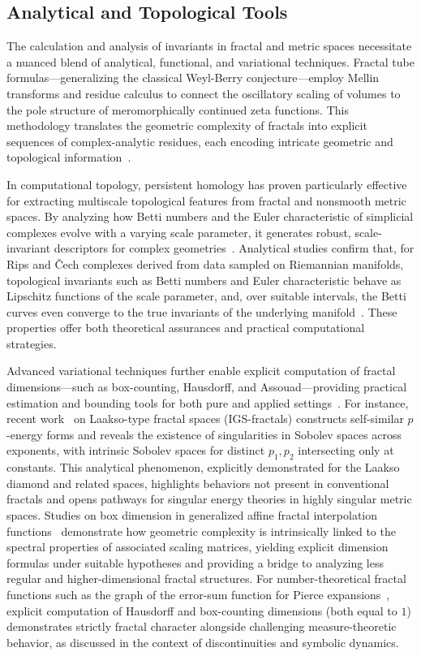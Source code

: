 \documentclass[sigconf]{acmart}
\begin{document}
\subsection{Analytical and Topological Tools}

The calculation and analysis of invariants in fractal and metric spaces necessitate a nuanced blend of analytical, functional, and variational techniques. Fractal tube formulas—generalizing the classical Weyl-Berry conjecture—employ Mellin transforms and residue calculus to connect the oscillatory scaling of volumes to the pole structure of meromorphically continued zeta functions. This methodology translates the geometric complexity of fractals into explicit sequences of complex-analytic residues, each encoding intricate geometric and topological information~\cite{ref21,ref33}.

In computational topology, persistent homology has proven particularly effective for extracting multiscale topological features from fractal and nonsmooth metric spaces. By analyzing how Betti numbers and the Euler characteristic of simplicial complexes evolve with a varying scale parameter, it generates robust, scale-invariant descriptors for complex geometries~\cite{ref88}. Analytical studies confirm that, for Rips and \v{C}ech complexes derived from data sampled on Riemannian manifolds, topological invariants such as Betti numbers and Euler characteristic behave as Lipschitz functions of the scale parameter, and, over suitable intervals, the Betti curves even converge to the true invariants of the underlying manifold~\cite{ref88}. These properties offer both theoretical assurances and practical computational strategies.

Advanced variational techniques further enable explicit computation of fractal dimensions—such as box-counting, Hausdorff, and Assouad—providing practical estimation and bounding tools for both pure and applied settings~\cite{ref13,ref43,ref27}. For instance, recent work~\cite{ref13} on Laakso-type fractal spaces (IGS-fractals) constructs self-similar $p$-energy forms and reveals the existence of singularities in Sobolev spaces across exponents, with intrinsic Sobolev spaces for distinct $p_1, p_2$ intersecting only at constants. This analytical phenomenon, explicitly demonstrated for the Laakso diamond and related spaces, highlights behaviors not present in conventional fractals and opens pathways for singular energy theories in highly singular metric spaces. Studies on box dimension in generalized affine fractal interpolation functions~\cite{ref28} demonstrate how geometric complexity is intrinsically linked to the spectral properties of associated scaling matrices, yielding explicit dimension formulas under suitable hypotheses and providing a bridge to analyzing less regular and higher-dimensional fractal structures. For number-theoretical fractal functions such as the graph of the error-sum function for Pierce expansions~\cite{ref27}, explicit computation of Hausdorff and box-counting dimensions (both equal to $1$) demonstrates strictly fractal character alongside challenging measure-theoretic behavior, as discussed in the context of discontinuities and symbolic dynamics.
\end{document}
